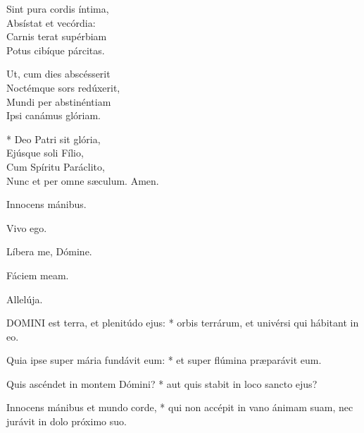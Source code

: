Sint pura cordis íntima,\\
Absístat et vecórdia:\\
Carnis terat supérbiam\\
Potus cibíque párcitas.

Ut, cum dies abscésserit\\
Noctémque sors redúxerit,\\
Mundi per abstinéntiam\\
Ipsi canámus glóriam.

* Deo Patri sit glória,\\
Ejúsque soli Fílio,\\
Cum Spíritu Paráclito,\\
Nunc et per omne sæculum. Amen.

  Innocens mánibus.




 Vivo ego.

  Líbera me, Dómine.

  Fáciem meam.

  Allelúja.



\lettrine[lines=2]{D}{OMINI} est terra, et plenitúdo ejus: * orbis terrárum, et univérsi qui hábitant in eo.

Quia ipse super mária fundávit eum: * et super flúmina præparávit eum.

Quis ascéndet in montem Dómini? * aut quis stabit in loco sancto ejus?

Innocens mánibus et mundo corde, * qui non accépit in vano ánimam suam, nec jurávit in dolo próximo suo.


